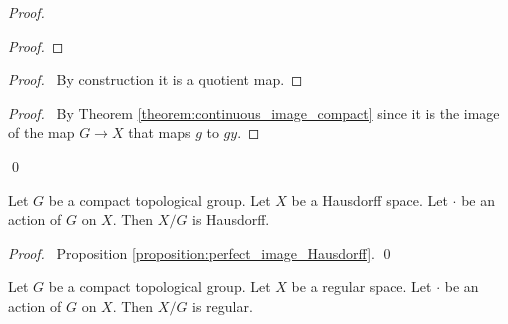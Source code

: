 \begin{proof}
    \pf
    \begin{proof}
    \end{proof}
    \begin{proof}
        \pf\ By construction it is a quotient map.
    \end{proof}
    \begin{proof}
        \pf\ By Theorem \ref{theorem:continuous_image_compact}
        since it is the image of the map $G \rightarrow X$ that maps $g$ to $gy$.
    \end{proof}
    \qed
\end{proof}

\begin{corollary}
    Let $G$ be a compact topological group. Let $X$ be a Hausdorff space.
    Let $\cdot$ be an action of $G$ on $X$. Then $X / G$ is Hausdorff.
\end{corollary}

\begin{proof}
    \pf\ Proposition \ref{proposition:perfect_image_Hausdorff}. \qed
\end{proof}

\begin{corollary}
    Let $G$ be a compact topological group. Let $X$ be a regular space.
    Let $\cdot$ be an action of $G$ on $X$. Then $X / G$ is regular.
\end{corollary}

